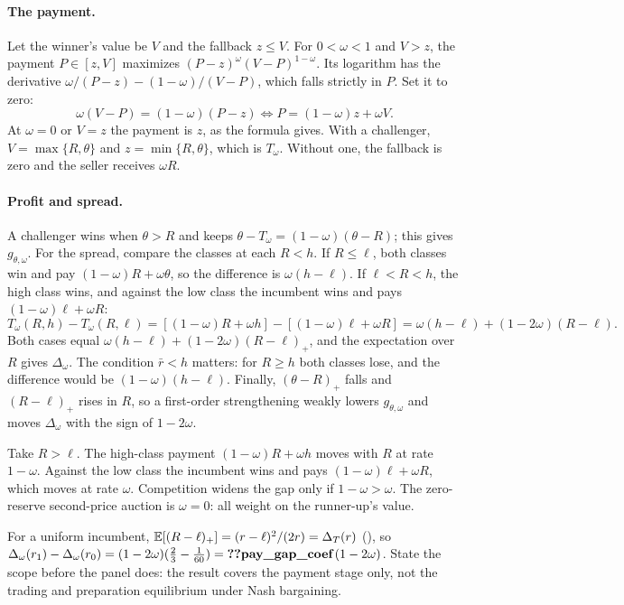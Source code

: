 \paragraph{The payment.} Let the winner's value be \(V\) and the fallback \(z\le V\). For \(0<\omega<1\) and \(V>z\),
the payment \(P\in[z,V]\) maximizes \((P-z)^\omega(V-P)^{1-\omega}\). Its logarithm has the derivative
\(\omega/(P-z)-(1-\omega)/(V-P)\), which falls strictly in \(P\). Set it to zero:
\[
\omega(V-P)=(1-\omega)(P-z)\iff P=(1-\omega)z+\omega V.
\]
At \(\omega=0\) or \(V=z\) the payment is \(z\), as the formula gives. With a challenger, \(V=\max\{R,\theta\}\) and
\(z=\min\{R,\theta\}\), which is \(T_\omega\). Without one, the fallback is zero and the seller receives \(\omega R\).

\paragraph{Profit and spread.} A challenger wins when \(\theta>R\) and keeps \(\theta-T_\omega=(1-\omega)(\theta-R)\);
this gives \(g_{\theta,\omega}\). For the spread, compare the classes at each \(R<h\). If \(R\le\ell\), both classes win and
pay \((1-\omega)R+\omega\theta\), so the difference is \(\omega(h-\ell)\). If \(\ell<R<h\), the high class wins, and against
the low class the incumbent wins and pays \((1-\omega)\ell+\omega R\):
\[
T_\omega(R,h)-T_\omega(R,\ell)=[(1-\omega)R+\omega h]-[(1-\omega)\ell+\omega R]=\omega(h-\ell)+(1-2\omega)(R-\ell).
\]
Both cases equal \(\omega(h-\ell)+(1-2\omega)(R-\ell)_+\), and the
expectation over \(R\) gives \(\Delta_\omega\). The condition \(\bar r<h\) matters: for \(R\ge h\) both classes lose, and
the difference would be \((1-\omega)(h-\ell)\). Finally, \((\theta-R)_+\) falls and \((R-\ell)_+\) rises in \(R\), so a
first-order strengthening weakly lowers \(g_{\theta,\omega}\) and moves \(\Delta_\omega\) with the sign of \(1-2\omega\).

\begin{intuition}[Sensitivities]
Take \(R>\ell\). The high-class payment \((1-\omega)R+\omega h\) moves with \(R\) at rate \(1-\omega\). Against the low
class the incumbent wins and pays \((1-\omega)\ell+\omega R\), which moves at rate \(\omega\). Competition widens the
gap only if \(1-\omega>\omega\). The zero-reserve second-price auction is \(\omega=0\): all weight on the runner-up's
value.
\end{intuition}

For a uniform incumbent, \(\mathbb{E}[(R-\ell)_+]=(r-\ell)^2/(2r)=\Delta_T(r)\) (), so
\(\Delta_\omega(r_1)-\Delta_\omega(r_0)=(1-2\omega)(\tfrac23-\tfrac1{60})=\reg{pay_gap_coef}\,(1-2\omega)\). State the scope
before the panel does: the result covers the payment stage only, not the trading and preparation equilibrium under
Nash bargaining.

